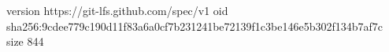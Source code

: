 version https://git-lfs.github.com/spec/v1
oid sha256:9cdee779c190d11f83a6a0cf7b231241be72139f1c3be146e5b302f134b7af7c
size 844

